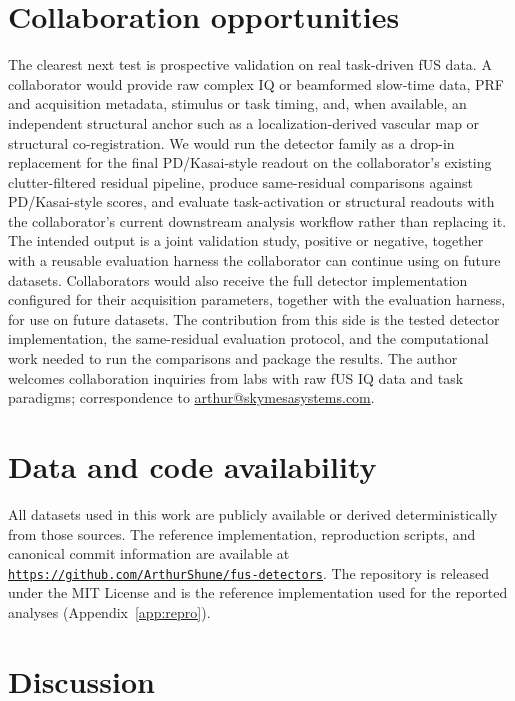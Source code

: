 \documentclass[11pt]{article}
\newif\ifPAPERONLY
\newcommand{\SuppOrApp}[1]{\ifPAPERONLY Supplementary Material\else Appendix~\ref{#1}\fi}
\begin{document}
\section*{Collaboration opportunities}
The clearest next test is prospective validation on real task-driven fUS data. A collaborator would provide raw complex IQ or beamformed slow-time data, PRF and acquisition metadata, stimulus or task timing, and, when available, an independent structural anchor such as a localization-derived vascular map or structural co-registration. We would run the detector family as a drop-in replacement for the final PD/Kasai-style readout on the collaborator's existing clutter-filtered residual pipeline, produce same-residual comparisons against PD/Kasai-style scores, and evaluate task-activation or structural readouts with the collaborator's current downstream analysis workflow rather than replacing it. The intended output is a joint validation study, positive or negative, together with a reusable evaluation harness the collaborator can continue using on future datasets. Collaborators would also receive the full detector implementation configured for their acquisition parameters, together with the evaluation harness, for use on future datasets. The contribution from this side is the tested detector implementation, the same-residual evaluation protocol, and the computational work needed to run the comparisons and package the results. The author welcomes collaboration inquiries from labs with raw fUS IQ data and task paradigms; correspondence to \href{mailto:arthur@skymesasystems.com}{arthur@skymesasystems.com}.

\section*{Data and code availability}
All datasets used in this work are publicly available or derived deterministically from those sources. The reference implementation, reproduction scripts, and canonical commit information are available at \href{https://github.com/ArthurShune/fus-detectors}{\texttt{https://github.com/ArthurShune/fus-detectors}}. The repository is released under the MIT License and is the reference implementation used for the reported analyses (\SuppOrApp{app:repro}).
\else
\section{Discussion}
\label{sec:discussion}
\end{document}
